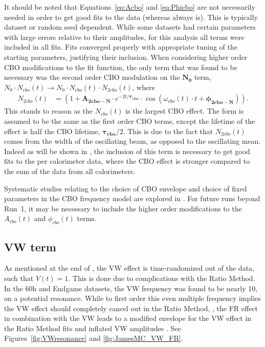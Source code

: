 It should be noted that Equations~\ref{eq:Acbo} and \ref{eq:Phicbo} are not necessarily needed in order to get good fits to the data (whereas  always is). This is typically dataset or random seed dependent. While some datasets had certain parameters with large errors relative to their amplitudes, for this analysis all terms were included in all fits. Fits converged properly with appropriate tuning of the starting parameters, justifying their inclusion. When considering higher order CBO modifications to the fit function, the only term that was found to be necessary was the second order CBO modulation on the $\boldsymbol{N_{0}}$ term, $N_{0} \cdot N_{cbo}(t) \rightarrow N_{0} \cdot N_{cbo}(t) \cdot  N_{2cbo}(t)$, where
    \begin{align}
        N_{2cbo}(t) &= (1 + \boldsymbol{A_{2cbo-N}} \cdot e^{-2t/\boldsymbol{\tau_{cbo}}} \cdot \cos(\omega_{cbo}(t) \cdot t + \boldsymbol{\phi_{2cbo-N}})). \label{eq:N2cbo}
    \end{align}
This stands to reason as the $N_{cbo}(t)$ is the largest CBO effect. The form is assumed to be the same as the first order CBO terms, except the lifetime of the effect is half the CBO lifetime, $\boldsymbol{\tau_{cbo}}/2$. This is due to the fact that $N_{2cbo}(t)$ comes from the width of the oscillating beam, as opposed to the oscillating mean. Indeed as will be shown in , the inclusion of this term is necessary to get good fits to the per calorimeter data, where the CBO effect is stronger compared to the sum of the data from all calorimeters. 




Systematic studies relating to the choice of CBO envelope and choice of fixed parameters in the CBO frequency model are explored in . For future runs beyond Run~1, it may be necessary to include the higher order modifications to the $A_{cbo}(t)$ and $\phi_{cbo}(t)$ terms.



\subsection{VW term}
\label{sub:vw_term}

As mentioned at the end of , the VW effect is time-randomized out of the data, such that $V(t) = 1$. This is done due to complications with the Ratio Method. In the 60h and Endgame datasets, the VW frequency was found to be nearly 10\wa, on a potential resonance. While to first order this even multiple frequency implies the VW effect should completely cancel out in the Ratio Method, , the FR effect in combination with the VW leads to a modified envelope for the VW effect in the Ratio Method fits and inflated VW amplitudes \cite{VWinRatio}. See Figures~\ref{fig:VWresonance} and \ref{fig:JamesMC_VW_FR}.

